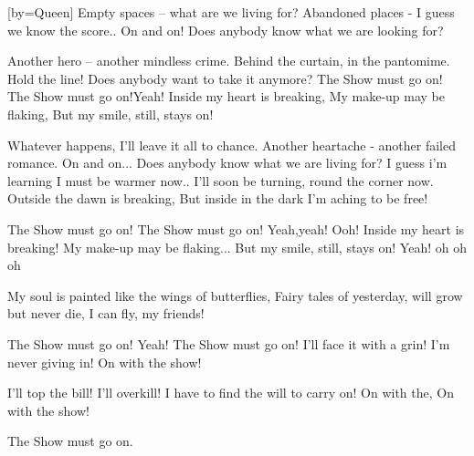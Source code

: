 [by={Queen}]
\beginverse
Empty spaces -- what are we living for?
Abandoned places - I guess we know the score..
On and on!
Does anybody know what we are looking for?
\endverse

\beginverse
Another hero -- another mindless crime.
Behind the curtain, in the pantomime.
Hold the line!
Does anybody want to take it anymore?
The Show must go on!
The Show must go on!Yeah!
Inside my heart is breaking,
My make-up may be flaking,
But my smile, still, stays on!
\endverse

\beginverse
Whatever happens, I'll leave it all to chance.
Another heartache - another failed romance.
On and on...
Does anybody know what we are living for?
I guess i'm learning
I must be warmer now..
I'll soon be turning, round the corner now.
Outside the dawn is breaking,
But inside in the dark I'm aching to be free!
\endverse

\beginchorus
The Show must go on!
The Show must go on! Yeah,yeah!
Ooh! Inside my heart is breaking!
My make-up may be flaking...
But my smile, still, stays on!
Yeah! oh oh oh
\endchorus

\beginverse
My soul is painted like the wings of butterflies,
Fairy tales of yesterday, will grow but never die,
I can fly, my friends!
\endverse

\beginchorus
The Show must go on! Yeah!
The Show must go on!
I'll face it with a grin!
I'm never giving in!
On with the show!
\endchorus

\beginverse
I'll top the bill!
I'll overkill!
I have to find the will to carry on!
On with the,
On with the show!

The Show must go on.
\endverse
\endsong